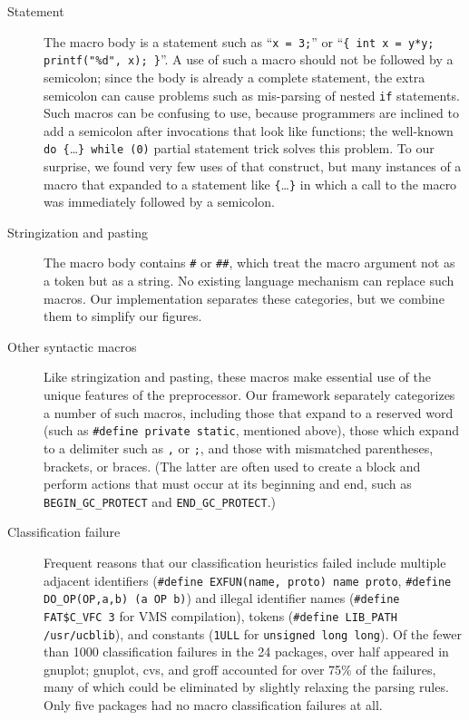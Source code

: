 \documentclass[11pt]{article}
\begin{document}
\begin{description}

\item[Statement]  The macro body is a statement such as ``{\tt x = 3;}'' or
  ``{\tt \verb|{| int x = y*y; printf("\%d", x); \verb|}|}''.  A use of such
  a macro should not be followed by a semicolon; since the body is
  already a complete statement, the extra semicolon can cause problems such as 
  mis-parsing of nested {\tt if} statements.  Such macros can be
  confusing to use, because programmers are inclined to add a semicolon
  after invocations that look like functions;   the
  well-known \verb|do {|\ldots\verb|} while (0)| partial statement trick
  solves this problem.  To our surprise, we found very few uses of that
  construct, but many instances of a macro that expanded to a statement
  like \verb|{|\ldots\verb|}| in which a call to the macro was immediately
  followed by a semicolon.

\item[Stringization and pasting]  The macro body contains {\tt \#} or
  {\tt \#\#}, which treat the macro argument not as a token but as a
  string.  No existing language mechanism can replace such macros.  Our
  implementation separates these categories, but we combine them to
  simplify our figures.

\item[Other syntactic macros]  Like stringization and pasting, these
  macros make essential use of the unique features of the preprocessor.
  Our framework separately categorizes a number of such macros, including
  those that expand to a reserved word (such as {\tt \#define private
  static}, mentioned above), those which expand to a delimiter such as
  {\tt ,} or {\tt ;}, and those with mismatched parentheses, brackets, or
  braces.  (The latter are often used to create a block and perform actions
  that must occur at its beginning and end, such as \verb|BEGIN_GC_PROTECT| and
  \verb|END_GC_PROTECT|.)

\item[Classification failure]  Frequent reasons that our
classification heuristics failed
  include multiple adjacent identifiers
  ({\tt \#define EXFUN(name, proto) name proto},
  {\tt \#define \verb|DO_OP|(OP,a,b) (a OP b)}) and illegal identifier
  names ({\tt \#define \verb|FAT$C_VFC| 3} for VMS compilation), tokens %
  ({\tt \#define \verb|LIB_PATH| /usr/ucblib}), and constants ({\tt 1ULL} for
  {\tt unsigned long long}).  Of the fewer than 1000 classification
  failures in the 24 packages, over half appeared in gnuplot; gnuplot, cvs,
  and groff accounted for over 75\% of the failures, many of which could be
  eliminated by slightly relaxing the parsing rules.  Only five packages had no
  macro classification failures at all.



\end{description}
\end{document}
